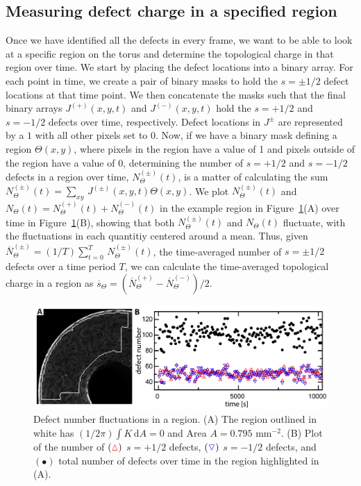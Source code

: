 \subsection{Measuring defect charge in a specified region}
Once we have identified all the defects in every frame, we want to be able to look at a specific region on the torus and determine the topological charge in that region over time.
We start by placing the defect locations into a binary array.
For each point in time, we create a pair of binary masks to hold the $s = \pm 1/2$ defect locations at that time point.
We then concatenate the masks such that the final binary arrays $J^{(+)}(x,y,t)$ and $J^{(-)}(x,y,t)$ hold the $s = +1/2$ and $s = -1/2$ defects over time, respectively.
Defect locations in $J^{\pm}$ are represented by a $1$ with all other pixels set to $0$.
Now, if we have a binary mask defining a region $\Theta(x,y)$, where pixels in the region have a value of 1 and pixels outside of the region have a value of $0$, determining the number of $s = +1/2$ and $s = -1/2$ defects in a region over time, $N^{(\pm)}_{\Theta}(t)$, is a matter of calculating the sum $N^{(\pm)}_{\Theta}(t) = \sum\limits_{xy}\,J^{(\pm)}(x,y,t)\Theta(x,y)$.
We plot $N^{(\pm)}_{\Theta}(t)$ and $N_{\Theta}(t) = N^{(+)}_{\Theta}(t) + N^{(-)}_{\Theta}(t)$ in the example region in Figure~\ref{f:3-NumberOverTime}(A) over time in Figure~\ref{f:3-NumberOverTime}(B), showing that both $N^{(\pm)}_{\Theta}(t)$ and $N_{\Theta}(t)$ fluctuate, with the fluctuations in each quantitiy centered around a mean.
Thus, given $\overbar{N}^{(\pm)}_{\Theta} = (1/T)\sum\limits_{t = 0}^T \, N^{(\pm)}_{\Theta}(t)$, the time-averaged number of $s = \pm 1/2$ defects over a time period $T$, we can calculate the time-averaged topological charge in a region as $\overbar{s}_{\Theta} = (\overbar{N}^{(+)}_{\Theta} - \overbar{N}^{(-)}_{\Theta})/2$.
\begin{figure}
  \centering
  \includegraphics{figures/C3/Ch3-Figs_NumberOverTime.png}
  \caption{Defect number fluctuations in a region.
  (A) The region outlined in white has $(1/2\pi)\int K\, \textrm{d}A = 0$ and Area $A = 0.795$ mm$^{-2}$.
  (B) Plot of the number of $({\color{red} \vartriangle})$ $s = + 1/2$ defects, $({\color{blue} \triangledown})$ $s = -1/2$ defects, and $(\bullet)$ total number of defects over time in the region highlighted in (A).}\label{f:3-NumberOverTime}
\end{figure}

